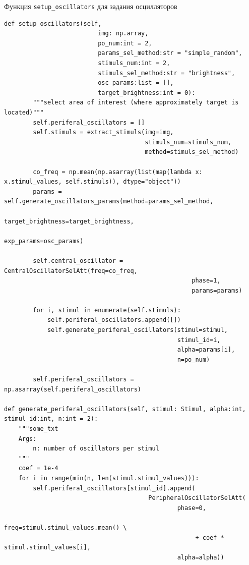 \documentclass[14pt, russian]{scrartcl}
\begin{document}
\begin{listing}[!htt]
    \caption{Функция \texttt{setup\_oscillators} для задания осцилляторов}
    \label{lst:hyp_data}
    \begin{verbatim}
def setup_oscillators(self, 
                          img: np.array, 
                          po_num:int = 2, 
                          params_sel_method:str = "simple_random",
                          stimuls_num:int = 2,
                          stimuls_sel_method:str = "brightness",
                          osc_params:list = [],
                          target_brightness:int = 0):
        """select area of interest (where approximately target is located)"""
        self.periferal_oscillators = []
        self.stimuls = extract_stimuls(img=img,
                                       stimuls_num=stimuls_num,
                                       method=stimuls_sel_method)

        co_freq = np.mean(np.asarray(list(map(lambda x: x.stimul_values, self.stimuls)), dtype="object"))
        params = self.generate_oscillators_params(method=params_sel_method, 
                                                  target_brightness=target_brightness,
                                                  exp_params=osc_params)

        self.central_oscillator = CentralOscillatorSelAtt(freq=co_freq,
                                                    phase=1,
                                                    params=params)
        
        for i, stimul in enumerate(self.stimuls):
            self.periferal_oscillators.append([])
            self.generate_periferal_oscillators(stimul=stimul, 
                                                stimul_id=i, 
                                                alpha=params[i],
                                                n=po_num)

        self.periferal_oscillators = np.asarray(self.periferal_oscillators)
        
def generate_periferal_oscillators(self, stimul: Stimul, alpha:int, stimul_id:int, n:int = 2):
    """some_txt
    Args:
        n: number of oscillators per stimul
    """
    coef = 1e-4
    for i in range(min(n, len(stimul.stimul_values))):
        self.periferal_oscillators[stimul_id].append(
                                        PeripheralOscillatorSelAtt(
                                                phase=0,
                                                freq=stimul.stimul_values.mean() \
                                                     + coef * stimul.stimul_values[i],
                                                alpha=alpha))
    \end{verbatim}
\end{listing}
\end{document}
